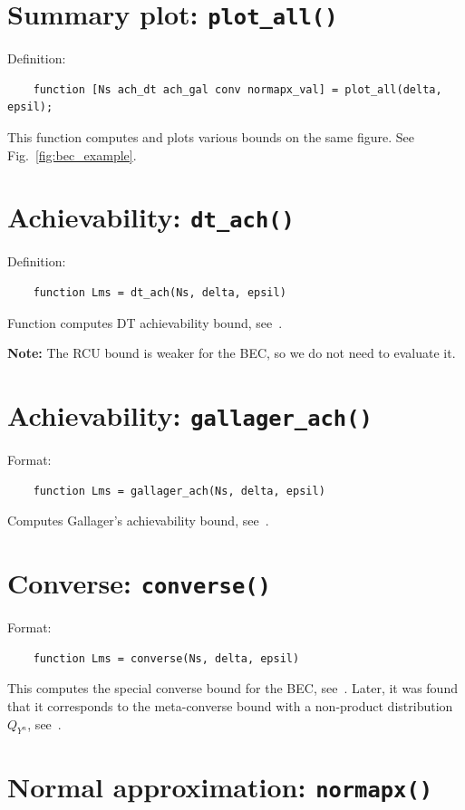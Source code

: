 \documentclass[a4paper,11p]{memoir}
\begin{document}
\section{Summary plot: \texttt{plot\_all()}}

Definition:
\begin{verbatim}
	function [Ns ach_dt ach_gal conv normapx_val] = plot_all(delta, epsil);
\end{verbatim}

This function computes and plots various bounds on the same figure. See Fig.~\ref{fig:bec_example}.


\section{Achievability: \texttt{dt\_ach()}}

Definition:
\begin{verbatim}
	function Lms = dt_ach(Ns, delta, epsil)
\end{verbatim}

Function computes DT achievability bound, see~\cite[(183)]{PPV08}.


\textbf{Note:} The RCU bound is weaker for the BEC, so we do not need to evaluate it.

\section{Achievability: \texttt{gallager\_ach()}}
Format:
\begin{verbatim}
	function Lms = gallager_ach(Ns, delta, epsil)
\end{verbatim}

Computes Gallager's achievability bound, see~\cite[(44)]{PPV08}.

\section{Converse: \texttt{converse()}}
Format:
\begin{verbatim}
	function Lms = converse(Ns, delta, epsil)
\end{verbatim}

This computes the special converse bound for the BEC, see~\cite[Theorem 38]{PPV08}. Later, it was found that it
corresponds to the meta-converse bound with a non-product distribution $Q_{Y^n}$, see~\cite[Section VI.D]{YP12}. 


\section{Normal approximation: \texttt{normapx()}}
\end{document}
